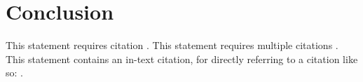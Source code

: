 \section{Conclusion}

This statement requires citation \autocite{Futaana2017SolarAtmosphere}. This statement requires multiple citations \autocite{Futaana2017SolarAtmosphere, Afshari2016X-RAYINGMAGNETOTAIL}. This statement contains an in-text citation, for directly referring to a citation like so: \textcite{Futaana2017SolarAtmosphere}.


